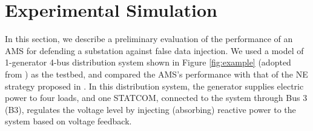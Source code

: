 \section{Experimental Simulation}
\label{simulation}

In this section, we describe a preliminary evaluation of the performance of an AMS for defending a substation against false data injection. We used a model of 1-generator 4-bus distribution system shown in Figure \ref{fig:example} (adopted from \cite{law2012security}) as the testbed, and compared the AMS's performance with that of the NE strategy proposed in \cite{law2012security,ma2013markov}. In this distribution system, the generator supplies electric power to four loads, and one STATCOM, connected to the system through Bus 3 (B3), regulates the voltage level by injecting (absorbing) reactive power to the system based on voltage feedback.

